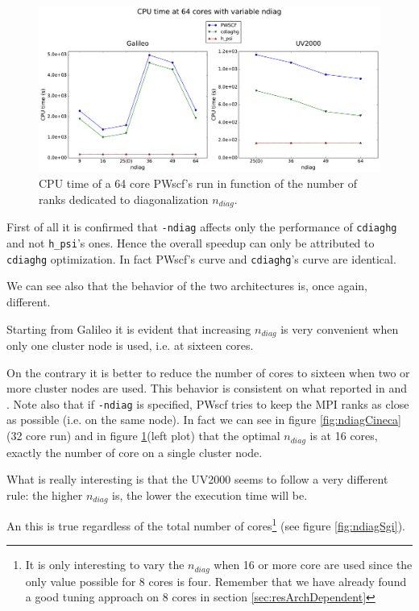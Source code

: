 \documentclass[a4paper,12pt]{article}
\begin{document}
\begin{figure}[hhh!]
\centerline{ \includegraphics[width=1.2\linewidth]{ndiag_64.pdf}	}
	\caption{CPU time of a 64 core PWscf's run in function of the number of ranks dedicated to diagonalization $n_{diag}$.}
	\label{fig:ndiag64}
\end{figure}

First of all it is confirmed that \texttt{-ndiag} affects only the performance of \texttt{cdiaghg} and not \texttt{h\_psi}'s ones.
Hence the overall speedup can only be attributed to \texttt{cdiaghg} optimization.
In fact PWscf's curve and \texttt{cdiaghg}'s curve are identical.

We can see also that the behavior of the two architectures is, once again, different.

Starting from Galileo it is evident that increasing $n_{diag}$ is very convenient when only one cluster node is used, i.e. at sixteen cores.

On the contrary it is better to reduce the number of cores to sixteen when two or more cluster nodes are used.
This behavior is consistent on what reported in \cite{QE} and \cite{QE2}.
Note also that if \texttt{-ndiag} is specified, PWscf tries to keep the MPI ranks as close as possible (i.e. on the same node). 
In fact we can see in figure \ref{fig:ndiagCineca}(32 core run) and in figure \ref{fig:ndiag64}(left plot) that the optimal $n_{diag}$ is at 16 cores, exactly the number of core on a single cluster node.


What is really interesting is that the UV2000 seems to follow a very different rule: the higher $n_{diag}$ is, the lower the execution time will be.


An this is true regardless of the total number of cores\footnote{It is only interesting to vary the $n_{diag}$ when 16 or more core are used since the only value possible for 8 cores is four. Remember that we have already found a good tuning approach on 8 cores in section \ref{sec:resArchDependent}} (see figure \ref{fig:ndiagSgi}).
\end{document}
